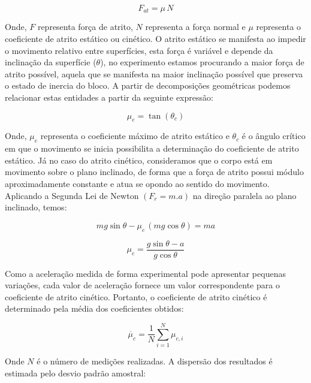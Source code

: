 \documentclass[12pt,a4paper]{article}
\begin{document}
\begin{equation}\label{eq:forca_atrito}
F_{at} = \mu\,N
\end{equation}

Onde, \(F\) representa força de atrito, \(N\) representa a força normal
e \(\mu\) representa o coeficiente de atrito estático ou cinético. O
atrito estático se manifesta ao impedir o movimento relativo entre
superfícies, esta força é variável e depende da inclinação da superfície
(\(\theta\)), no experimento estamos procurando a maior força de atrito
possível, aquela que se manifesta na maior inclinação possível que
preserva o estado de inercia do bloco. A partir de decomposições
geométricas podemos relacionar estas entidades a partir da seguinte
expressão:

\begin{equation}\label{eq:mu_estatico}
\mu_e = \tan(\theta_c)
\end{equation}

Onde, \(\mu_{e}\) representa o coeficiente máximo de atrito estático e
\(\theta_{c}\) é o ângulo crítico em que o movimento se inicia
possibilita a determinação do coeficiente de atrito estático. Já no caso
do atrito cinético, consideramos que o corpo está em movimento sobre o
plano inclinado, de forma que a força de atrito possui módulo
aproximadamente constante e atua se opondo ao sentido do movimento.
Aplicando a Segunda Lei de Newton \((F_{r} = m.a)\) na direção paralela
ao plano inclinado, temos:

\begin{equation}\label{eq:segunda_lei}
mg\sin\theta - \mu_c\,(mg\cos\theta) = ma
\end{equation}

\begin{equation}\label{eq:mu_cinetico}
\mu_c = \frac{g\sin\theta - a}{g\cos\theta}
\end{equation}

Como a aceleração medida de forma experimental pode apresentar pequenas
variações, cada valor de aceleração fornece um valor correspondente para
o coeficiente de atrito cinético. Portanto, o coeficiente de atrito
cinético é determinado pela média dos coeficientes obtidos:

\begin{equation}\label{eq:media}
\overline{\mu}_c = \frac{1}{N}\sum_{i=1}^{N} \mu_{c,i}
\end{equation}

Onde \(N\) é o número de medições realizadas. A dispersão dos resultados
é estimada pelo desvio padrão amostral:
\end{document}
